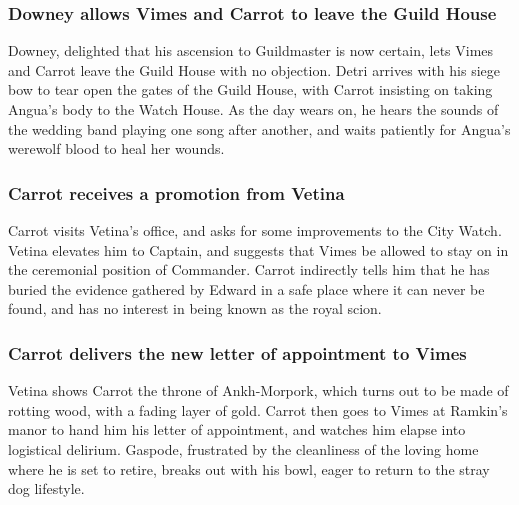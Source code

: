 \subsubsection{\Gls{Downey} allows \Gls{Vimes} and \Gls{Carrot} to leave the Guild House}
\Gls{Downey}, delighted that his ascension to Guildmaster is now certain, lets \Gls{Vimes} and
\Gls{Carrot} leave the Guild House with no objection. \Gls{Detri} arrives with his siege bow to
tear open the gates of the Guild House, with \Gls{Carrot} insisting on taking \Gls{Angua}'s body
to the Watch House. As the day wears on, he hears the sounds of the wedding band playing one song
after another, and waits patiently for \Gls{Angua}'s werewolf blood to heal her wounds.

\subsubsection{\Gls{Carrot} receives a promotion from \Gls{Vetina}}
\Gls{Carrot} visits \Gls{Vetina}'s office, and asks for some improvements to the City Watch.
\Gls{Vetina} elevates him to Captain, and suggests that \Gls{Vimes} be allowed to stay on in the
ceremonial position of Commander. \Gls{Carrot} indirectly tells him that he has buried the evidence
gathered by \Gls{Edward} in a safe place where it can never be found, and has no interest in being
known as the royal scion.

\subsubsection{\Gls{Carrot} delivers the new letter of appointment to \Gls{Vimes}}
\Gls{Vetina} shows \Gls{Carrot} the throne of Ankh-Morpork, which turns out to be made of rotting
wood, with a fading layer of gold. \Gls{Carrot} then goes to \Gls{Vimes} at \Gls{Ramkin}'s manor
to hand him his letter of appointment, and watches him elapse into logistical delirium.
\Gls{Gaspode}, frustrated by the cleanliness of the loving home where he is set to retire, breaks
out with his bowl, eager to return to the stray dog lifestyle.
